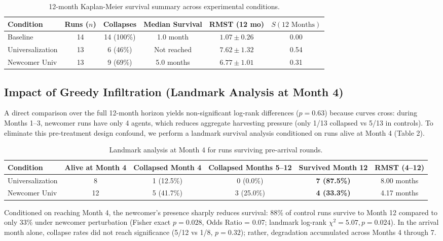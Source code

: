 ﻿\documentclass[11pt,a4paper]{article}
\begin{document}
\begin{table}[h]
\centering
\small
\caption{12-month Kaplan-Meier survival summary across experimental conditions.}
\vspace{0.1cm}
\begin{tabular}{lccccc}
\toprule
\textbf{Condition} & \textbf{Runs ($n$)} & \textbf{Collapses} & \textbf{Median Survival} & \textbf{RMST (12 mo)} & \textbf{$S(12\text{ Months})$} \\
\midrule
Baseline & 14 & 14 (100\%) & 1.0 month & $1.07 \pm 0.26$ & 0.00 \\
Universalization & 13 & 6 (46\%) & Not reached & $7.62 \pm 1.32$ & 0.54 \\
Newcomer Univ & 13 & 9 (69\%) & 5.0 months & $6.77 \pm 1.01$ & 0.31 \\
\bottomrule
\end{tabular}
\end{table}

\subsection{Impact of Greedy Infiltration (Landmark Analysis at Month 4)}
A direct comparison over the full 12-month horizon yields non-significant log-rank differences ($p = 0.63$) because curves cross: during Months 1--3, newcomer runs have only 4 agents, which reduces aggregate harvesting pressure (only 1/13 collapsed vs 5/13 in controls). To eliminate this pre-treatment design confound, we perform a landmark survival analysis conditioned on runs alive at Month 4 (Table 2).

\begin{table}[h]
\centering
\small
\caption{Landmark analysis at Month 4 for runs surviving pre-arrival rounds.}
\vspace{0.1cm}
\begin{tabular}{lccccc}
\toprule
\textbf{Condition} & \textbf{Alive at Month 4} & \textbf{Collapsed Month 4} & \textbf{Collapsed Months 5--12} & \textbf{Survived Month 12} & \textbf{RMST (4--12)} \\
\midrule
Universalization & 8 & 1 (12.5\%) & 0 (0.0\%) & \textbf{7 (87.5\%)} & 8.00 months \\
Newcomer Univ & 12 & 5 (41.7\%) & 3 (25.0\%) & \textbf{4 (33.3\%)} & 4.17 months \\
\bottomrule
\end{tabular}
\end{table}

Conditioned on reaching Month 4, the newcomer's presence sharply reduces survival: 88\% of control runs survive to Month 12 compared to only 33\% under newcomer perturbation (Fisher exact $p = 0.028$, Odds Ratio = 0.07; landmark log-rank $\chi^2 = 5.07, p = 0.024$). In the arrival month alone, collapse rates did not reach significance (5/12 vs 1/8, $p = 0.32$); rather, degradation accumulated across Months 4 through 7.
\end{document}
